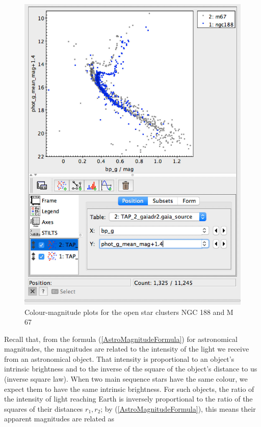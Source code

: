 \documentclass[twocolumn,apj]{openjournal}
\begin{document}
\begin{figure}[htbp]
\begin{center}
\includegraphics[width=\linewidth]{ngc188m67CompShift.jpg}
\caption{Colour-magnitude plots for the open star clusters NGC 188 and M 67}
\label{NGC188M67CompShift}
\end{center}
\end{figure}
Recall that, from the formula (\ref{AstroMagnitudeFormula}) for astronomical magnitudes, the magnitudes are related to the intensity of the light we receive from an astronomical object. That intensity is proportional to an object's intrinsic brightness and to the inverse of the square of the object's distance to us (inverse square law). When two main sequence stars have the same colour, we expect them to have the same intrinsic brightness. For such objects, the ratio of the intensity of light reaching Earth is inversely proportional to the ratio of the squares of their distances $r_1, r_2$; by (\ref{AstroMagnitudeFormula}), this means their apparent magnitudes are related as
\end{document}

